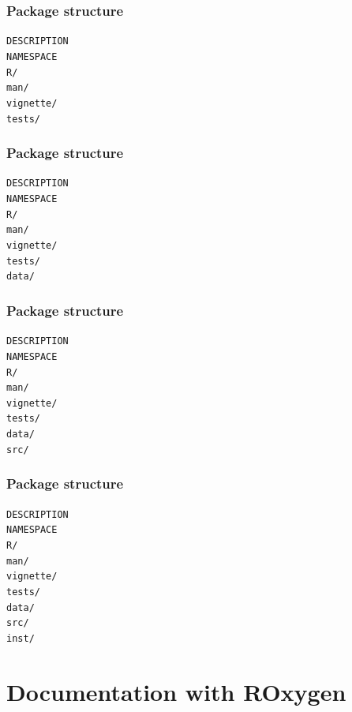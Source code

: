 \documentclass{beamer}
\begin{document}
\begin{frame}
	\frametitle{Package structure}
	\texttt{DESCRIPTION} \\
	\texttt{NAMESPACE} \\
	\texttt{R/} \\
	\texttt{man/} \\
	\texttt{vignette/} \\
	\texttt{tests/} 
\end{frame}

\begin{frame}
	\frametitle{Package structure}
	\texttt{DESCRIPTION} \\
	\texttt{NAMESPACE} \\
	\texttt{R/} \\
	\texttt{man/} \\
	\texttt{vignette/} \\
	\texttt{tests/} \\
	\texttt{data/} 
\end{frame}

\begin{frame}
	\frametitle{Package structure}
	\texttt{DESCRIPTION} \\
	\texttt{NAMESPACE} \\
	\texttt{R/} \\
	\texttt{man/} \\
	\texttt{vignette/} \\
	\texttt{tests/} \\
	\texttt{data/} \\
	\texttt{src/} 
\end{frame}

\begin{frame}
	\frametitle{Package structure}
	\texttt{DESCRIPTION} \\
	\texttt{NAMESPACE} \\
	\texttt{R/} \\
	\texttt{man/} \\
	\texttt{vignette/} \\
	\texttt{tests/} \\
	\texttt{data/} \\
	\texttt{src/} \\
	\texttt{inst/} 
\end{frame}

\section{Documentation with ROxygen} 
\end{document}
